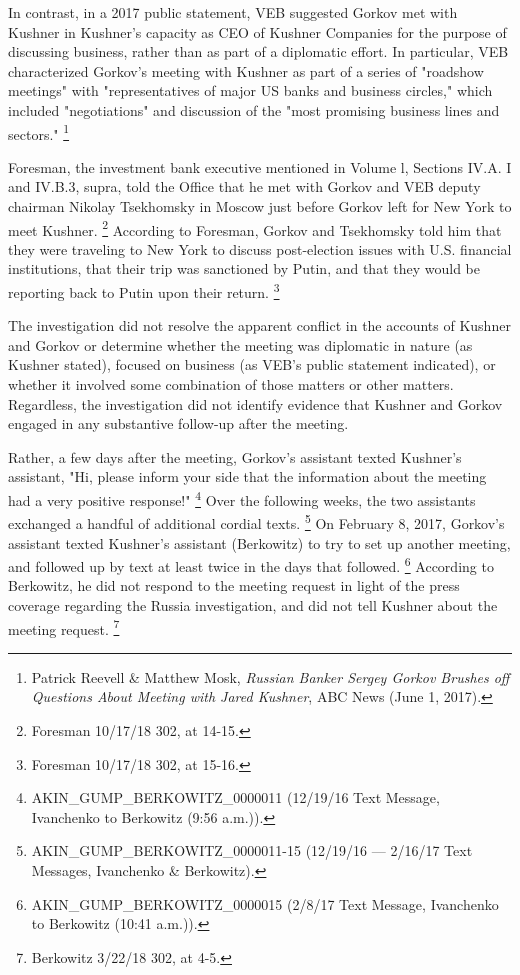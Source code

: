 In contrast, in a 2017 public statement, VEB suggested Gorkov met with Kushner in Kushner's capacity as CEO of Kushner Companies for the purpose of discussing business, rather than as part of a diplomatic effort.
In particular, VEB characterized Gorkov's meeting with Kushner as part of a series of "roadshow meetings" with "representatives of major US banks and business circles," which included "negotiations" and discussion of the "most promising business lines and sectors."%
\footnote{Patrick Reevell \& Matthew Mosk, \textit{Russian Banker Sergey Gorkov Brushes off Questions About Meeting with Jared Kushner}, ABC News (June 1, 2017).}

Foresman, the investment bank executive mentioned in Volume l, Sections IV.A. I and IV.B.3, supra, told the Office that he met with Gorkov and VEB deputy chairman Nikolay Tsekhomsky in Moscow just before Gorkov left for New York to meet Kushner.%
\footnote{Foresman 10/17/18 302, at 14-15.}
According to Foresman, Gorkov and Tsekhomsky told him that they were traveling to New York to discuss post-election issues with U.S. financial institutions, that their trip was sanctioned by Putin, and that they would be reporting back to Putin upon their return.%
\footnote{Foresman 10/17/18 302, at 15-16.}

The investigation did not resolve the apparent conflict in the accounts of Kushner and Gorkov or determine whether the meeting was diplomatic in nature (as Kushner stated), focused on business (as VEB's public statement indicated), or whether it involved some combination of those matters or other matters.
Regardless, the investigation did not identify evidence that Kushner and Gorkov engaged in any substantive follow-up after the meeting.

Rather, a few days after the meeting, Gorkov's assistant texted Kushner's assistant, "Hi, please inform your side that the information about the meeting had a very positive response!"%
\footnote{AKIN\_GUMP\_BERKOWITZ\_0000011 (12/19/16 Text Message, Ivanchenko to Berkowitz (9:56 a.m.)).}
Over the following weeks, the two assistants exchanged a handful of additional cordial texts.%
\footnote{AKIN\_GUMP\_BERKOWITZ\_0000011-15 (12/19/16 — 2/16/17 Text Messages, Ivanchenko \& Berkowitz).}
On February 8, 2017, Gorkov's assistant texted Kushner's assistant (Berkowitz) to try to set up another meeting, and followed up by text at least twice in the days that followed.%
\footnote{AKIN\_GUMP\_BERKOWITZ\_0000015 (2/8/17 Text Message, Ivanchenko to Berkowitz (10:41 a.m.)).}
According to Berkowitz, he did not respond to the meeting request in light of the press coverage regarding the Russia investigation, and did not tell Kushner about the meeting request.%
\footnote{Berkowitz 3/22/18 302, at 4-5.}

